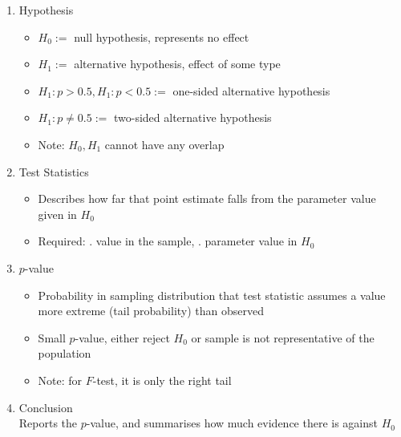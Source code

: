 \documentclass[a4paper,12pt,landscape]{article}
\begin{document}
\begin{multicols}{3}
\begin{enumerate}
  \item{Hypothesis}
  \begin{itemize}
    \item $H_0 :=$ null hypothesis, represents no effect\\
    \item $H_1 :=$ alternative hypothesis, effect of some type\\
    \item $H_1: p > 0.5, H_1: p < 0.5 :=$ one-sided alternative hypothesis\\
    \item $H_1: p \neq 0.5 :=$ two-sided alternative hypothesis\\
    \item Note: $H_0, H_1$ cannot have any overlap
  \end{itemize}

  \item{Test Statistics}
  \begin{itemize}
    \item Describes how far that point estimate falls from the parameter value given in $H_0$\\
    \item Required: 
        . value in the sample, 
        . parameter value in $H_0$
  \end{itemize}

		\item{$p$-value}
			\begin{itemize}
				\item Probability in sampling distribution that test statistic assumes a value more extreme (tail probability) than observed\\
				\item Small $p$-value, either reject $H_0$ or sample is not representative of the population\\
				\item Note: for $F$-test, it is only the right tail
			\end{itemize}

		\item{Conclusion}\\
			Reports the $p$-value, and summarises how much evidence there is against $H_0$

	\end{enumerate}


\end{multicols}
\end{document}
